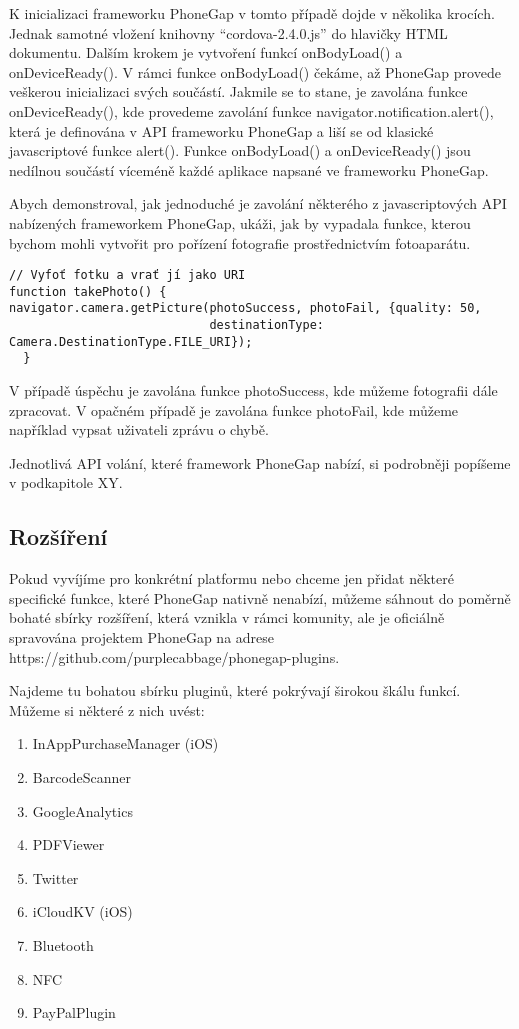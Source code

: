 K inicializaci frameworku PhoneGap v tomto případě dojde v několika krocích. Jednak samotné vložení knihovny “cordova-2.4.0.js” do hlavičky HTML dokumentu. Dalším krokem je vytvoření funkcí onBodyLoad() a onDeviceReady(). V rámci funkce onBodyLoad() čekáme, až PhoneGap provede veškerou inicializaci svých součástí. Jakmile se to stane, je zavolána funkce onDeviceReady(), kde provedeme zavolání funkce navigator.notification.alert(), která je definována v API frameworku PhoneGap a liší se od klasické javascriptové funkce alert(). Funkce onBodyLoad() a onDeviceReady() jsou nedílnou součástí víceméně každé aplikace napsané ve frameworku PhoneGap.

Abych demonstroval, jak jednoduché je zavolání některého z javascriptových API nabízených frameworkem PhoneGap, ukáži, jak by vypadala funkce, kterou bychom mohli vytvořit pro pořízení fotografie prostřednictvím fotoaparátu.

\begin{verbatim}
// Vyfoť fotku a vrať jí jako URI
function takePhoto() {
navigator.camera.getPicture(photoSuccess, photoFail, {quality: 50,
                            destinationType: Camera.DestinationType.FILE_URI});
  }
\end{verbatim}

V případě úspěchu je zavolána funkce photoSuccess, kde můžeme fotografii dále zpracovat. V opačném případě je zavolána funkce photoFail, kde můžeme například vypsat uživateli zprávu o chybě.

Jednotlivá API volání, které framework PhoneGap nabízí, si podrobněji popíšeme v podkapitole XY.

\subsection{Rozšíření}
Pokud vyvíjíme pro konkrétní platformu nebo chceme jen přidat některé specifické funkce, které PhoneGap nativně nenabízí, můžeme sáhnout do poměrně bohaté sbírky rozšíření, která vznikla v rámci komunity, ale je oficiálně spravována projektem PhoneGap na adrese https://github.com/purplecabbage/phonegap-plugins.

Najdeme tu bohatou sbírku pluginů, které pokrývají širokou škálu funkcí. Můžeme si některé z nich uvést:

\begin{enumerate}
  \item InAppPurchaseManager (iOS)
  \item BarcodeScanner
  \item GoogleAnalytics
  \item PDFViewer
  \item Twitter
  \item iCloudKV (iOS)
  \item Bluetooth
  \item NFC
  \item PayPalPlugin
\end{enumerate}

